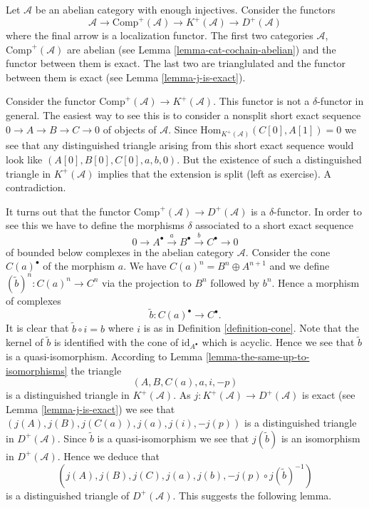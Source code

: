 \noindent
Let $\mathcal{A}$ be an abelian category with enough injectives.
Consider the functors
$$
\mathcal{A} \to \text{Comp}^{+}(\mathcal{A})
\to K^{+}(\mathcal{A}) \to D^{+}(\mathcal{A})
$$
where the final arrow is a localization functor.
The first two categories $\mathcal{A}$,
$\text{Comp}^{+}(\mathcal{A})$ are abelian
(see Lemma \ref{lemma-cat-cochain-abelian}) and the functor
between them is exact. The last two are trianglulated and the
functor between them is exact (see Lemma \ref{lemma-j-is-exact}).

\medskip\noindent
Consider the functor
$\text{Comp}^{+}(\mathcal{A}) \to K^{+}(\mathcal{A})$.
This functor is not a $\delta$-functor in general.
The easiest way to see this is to consider a nonsplit
short exact sequence $0 \to A \to B \to C \to 0$
of objects of $\mathcal{A}$. Since
$\text{Hom}_{K^{+}(\mathcal{A})}(C[0], A[1]) = 0$
we see that any distinguished triangle arising from
this short exact sequence would look like
$(A[0], B[0], C[0], a, b, 0)$. But the existence of such a
distinguished triangle in $K^{+}(\mathcal{A})$ implies
that the extension is split (left as exercise). A contradiction.

\medskip\noindent
It turns out that the functor
$\text{Comp}^{+}(\mathcal{A}) \to D^{+}(\mathcal{A})$ is a
$\delta$-functor. In order to see this we have to define
the morphisms $\delta$ associated to a short exact sequence
$$
0 \to A^\bullet \xrightarrow{a} B^\bullet \xrightarrow{b} C^\bullet \to 0
$$
of bounded below complexes in the abelian category $\mathcal{A}$.
Consider the cone $C(a)^\bullet$ of the morphism $a$.
We have $C(a)^n = B^n \oplus A^{n + 1}$ and we define
$(\tilde b)^n : C(a)^n \to C^n$ via the projection to $B^n$ followed
by $b ^n$. Hence a morphism of complexes
$$
\tilde b : C(a)^\bullet \longrightarrow C^\bullet.
$$
It is clear that $\tilde b \circ i = b$ where $i$ is as in
Definition \ref{definition-cone}.
Note that the kernel of $\tilde b$ is identified with
the cone of $\text{id}_{A^\bullet}$ which is acyclic.
Hence we see that $\tilde b$ is a quasi-isomorphism.
According to Lemma \ref{lemma-the-same-up-to-isomorphisms} the triangle
$$
(A, B, C(a), a, i, -p)
$$
is a distinguished triangle in $K^{+}(\mathcal{A})$.
As $j : K^{+}(\mathcal{A}) \to D^{+}(\mathcal{A})$ is
exact (see Lemma \ref{lemma-j-is-exact}) we see that
$(j(A), j(B), j(C(a)), j(a), j(i), -j(p))$ is a distinguished
triangle in $D^{+}(\mathcal{A})$. Since $\tilde b$ is a quasi-isomorphism
we see that $j(\tilde b)$ is an isomorphism in $D^{+}(\mathcal{A})$.
Hence we deduce that
$$
(j(A), j(B), j(C), j(a), j(b), -j(p) \circ j(\tilde b)^{-1})
$$
is a distinguished triangle of $D^{+}(\mathcal{A})$.
This suggests the following lemma.

